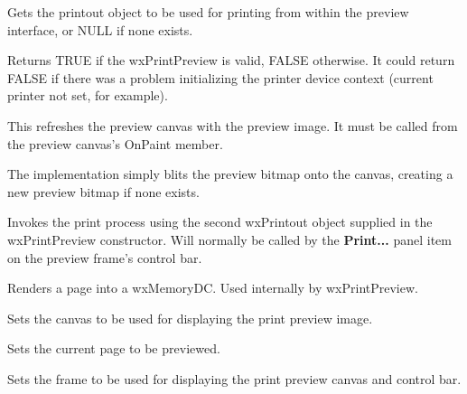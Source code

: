 

Gets the printout object to be used for printing from within the preview interface,
or NULL if none exists.



Returns TRUE if the wxPrintPreview is valid, FALSE otherwise. It could return FALSE if there was a
problem initializing the printer device context (current printer not set, for example).



This refreshes the preview canvas with the preview image.
It must be called from the preview canvas's OnPaint member.

The implementation simply blits the preview bitmap onto
the canvas, creating a new preview bitmap if none exists.



Invokes the print process using the second wxPrintout object
supplied in the wxPrintPreview constructor.
Will normally be called by the {\bf Print...} panel item on the
preview frame's control bar.



Renders a page into a wxMemoryDC. Used internally by wxPrintPreview.



Sets the canvas to be used for displaying the print preview image.



Sets the current page to be previewed.



Sets the frame to be used for displaying the print preview canvas
and control bar.


